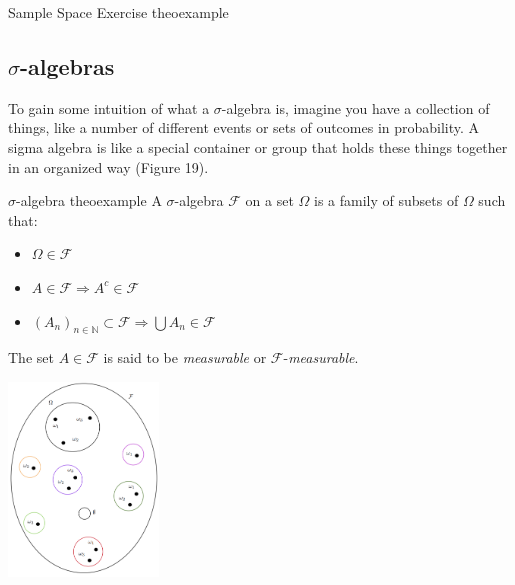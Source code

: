 \documentclass{tufte-handout}
\begin{document}
\begin{mybox}{Sample Space Exercise }{theoexample}
\begin{itemize}
\begin{enumerate}
\end{enumerate}  

\end{itemize}

\end{mybox}


\subsection{$\sigma$-algebras}

To gain some intuition of what a $\sigma$-algebra is, imagine you have a collection of things, like a number of different events or sets of outcomes in probability. A sigma algebra is like a special container or group that holds these things together in an organized way (Figure 19). 

\begin{mydef}{$\sigma$-algebra }{theoexample}  
A $\sigma$-algebra  $\mathscr F$ on a set $\Omega$ is a family of subsets of $\Omega$ such that:
\begin{itemize}
\item $\Omega \in \mathscr F$ 
\item $A \in \mathscr F \Longrightarrow A^c \in \mathscr F$ 
\item $(A_n)_{n \in \mathbb N} \subset \mathscr F \Longrightarrow  \bigcup A_n \in \mathscr F$
\end{itemize}
The set  $A \in \mathscr F$  is said to be \textit{measurable} or $\mathscr F$-\textit{measurable}.
\end{mydef}


\begin{marginfigure}
\centering
\includegraphics[width=4cm]{fig/es.png}
\caption{The event space is a $\sigma$-algebra on the sample space $\Omega$. It is a subset of the power set,
$\mathcal P(\Omega)$,  
 whose elements, called events, satisfy some regularity conditions. When 
 is finite and discrete, the power set is a valid $\sigma$-algebra that can be used as the event space.
The  $\sigma$-algebra satisfies $\Omega 	\in  \mathcal F$; the sample space is an event called the \textit{sure} event.
$A\mathcal \in  F \Longrightarrow A^c \in \mathcal F$, i.e., $\mathcal F$ is \textit{closed} under complementation.
 $A_1, A_2, \dots$, $ \bigcup A_n \in \mathscr F$, so  $F$ is closed under \textit{countable unions}.
 Source: http://bit.ly/3s11bq5.  
}
\end{marginfigure}
\end{document}
